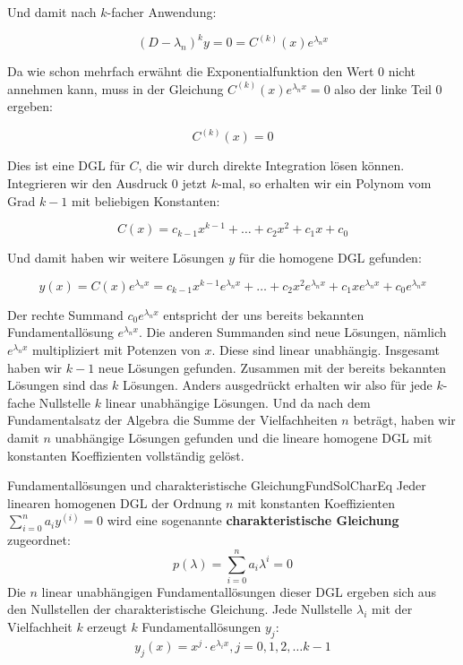 Und damit nach $k$-facher Anwendung:

$$
    (D-\lambda_n)^k y = 0 = C^{(k)}(x) e^{\lambda_n x}
$$

Da wie schon mehrfach erwähnt die Exponentialfunktion den Wert $0$ nicht annehmen kann, muss in der Gleichung $C^{(k)}(x) e^{\lambda_n x} = 0$ also der linke Teil $0$ ergeben:

$$
    C^{(k)}(x) = 0
$$

Dies ist eine DGL für $C$, die wir durch direkte Integration lösen können. Integrieren wir den Ausdruck $0$ jetzt $k$-mal, so erhalten wir ein Polynom vom Grad $k-1$ mit beliebigen Konstanten:

$$
    C(x) = c_{k-1} x^{k-1} + \dots + c_2 x^2 + c_1 x + c_0
$$

Und damit haben wir weitere Lösungen $y$ für die homogene DGL gefunden:

$$
    y(x) = C(x) e^{\lambda_n x} = c_{k-1} x^{k-1} e^{\lambda_n x} + \dots + c_2 x^2 e^{\lambda_n x} + c_1 x e^{\lambda_n x} + c_0 e^{\lambda_n x}
$$

Der rechte Summand $c_0 e^{\lambda_n x}$ entspricht der uns bereits bekannten Fundamentallösung $e^{\lambda_n x}$. Die anderen Summanden sind neue Lösungen, nämlich $e^{\lambda_n x}$ multipliziert mit Potenzen von $x$. Diese sind linear unabhängig. Insgesamt haben wir $k-1$ neue Lösungen gefunden. Zusammen mit der bereits bekannten Lösungen sind das $k$ Lösungen. Anders ausgedrückt erhalten wir also für jede $k$-fache Nullstelle $k$ linear unabhängige Lösungen. Und da nach dem Fundamentalsatz der Algebra die Summe der Vielfachheiten $n$ beträgt, haben wir damit $n$ unabhängige Lösungen gefunden und die lineare homogene DGL mit konstanten Koeffizienten vollständig gelöst.

\begin{statement}{Fundamentallösungen und charakteristische Gleichung}{FundSolCharEq}
    Jeder linearen homogenen DGL der Ordnung $n$ mit konstanten Koeffizienten $\sum\limits_{i=0}^n a_i y^{(i)} = 0$ wird eine sogenannte \textbf{charakteristische Gleichung} zugeordnet:
    $$
        p(\lambda) = \sum\limits_{i=0}^n a_i \lambda^i = 0
    $$
    Die $n$ linear unabhängigen Fundamentallösungen dieser DGL ergeben sich aus den Nullstellen der charakteristische Gleichung. Jede Nullstelle $\lambda_i$ mit der Vielfachheit $k$ erzeugt $k$ Fundamentallösungen $y_j$:
    $$
        y_j(x) = x^j \cdot e^{\lambda_i x}, j = 0, 1, 2, \dots {k-1}
    $$
\end{statement}

